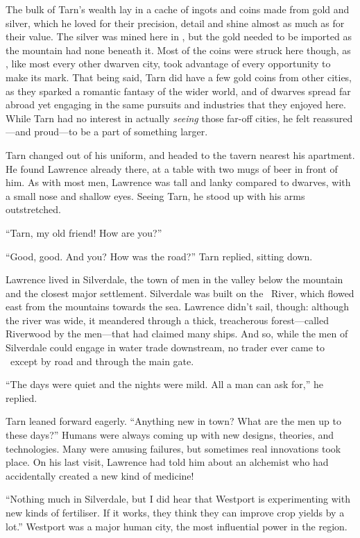 The bulk of Tarn's wealth lay in a cache of ingots and coins made from gold and silver, which he loved for their precision, detail and shine almost as much as for their value.  The silver was mined here in \korbarthrond, but the gold needed to be imported as the mountain had none beneath it.  Most of the coins were struck here though, as \korbarthrond, like most every other dwarven city, took advantage of every opportunity to make its mark.  That being said, Tarn did have a few gold coins from other cities, as they sparked a romantic fantasy of the wider world, and of dwarves spread far abroad yet engaging in the same pursuits and industries that they enjoyed here.  While Tarn had no interest in actually \emph{seeing} those far-off cities, he felt reassured---and proud---to be a part of something larger.

Tarn changed out of his uniform, and headed to the tavern nearest his apartment.  He found Lawrence already there, at a table with two mugs of beer in front of him.  As with most men, Lawrence was tall and lanky compared to dwarves, with a small nose and shallow eyes.  Seeing Tarn, he stood up with his arms outstretched.

``Tarn, my old friend!  How are you?''

``Good, good.  And you?  How was the road?'' Tarn replied, sitting down.

Lawrence lived in Silverdale, the town of men in the valley below the mountain and the closest major settlement.  Silverdale was built on the \korbarthrond\ River, which flowed east from the mountains towards the sea.  Lawrence didn't sail, though: although the river was wide, it meandered through a thick, treacherous forest---called Riverwood by the men---that had claimed many ships.  And so, while the men of Silverdale could engage in water trade downstream, no trader ever came to \korbarthrond\ except by road and through the main gate.

``The days were quiet and the nights were mild.  All a man can ask for,'' he replied.


Tarn leaned forward eagerly.  ``Anything new in town?  What are the men up to these days?''  Humans were always coming up with new designs, theories, and technologies.  Many were amusing failures, but sometimes real innovations took place.  On his last visit, Lawrence had told him about an alchemist who had accidentally created a new kind of medicine!

``Nothing much in Silverdale, but I did hear that Westport is experimenting with new kinds of fertiliser.  If it works, they think they can improve crop yields by a lot.''  Westport was a major human city, the most influential power in the region.

